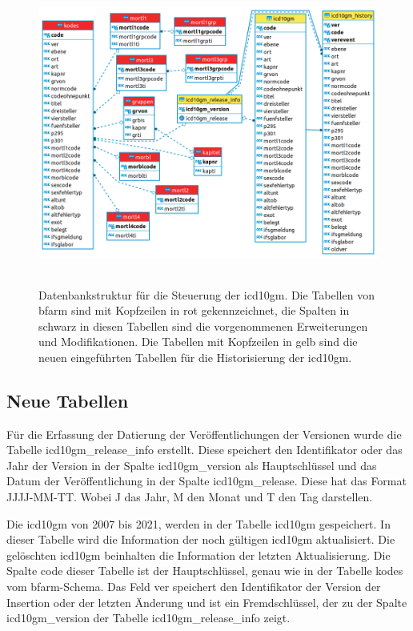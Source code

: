 \clearpage	

\begin{figure}[ht]
	\centering
	\includegraphics[height=10cm]{figures/icdSqlSchema}
	\caption[Datenbankstruktur]{Datenbankstruktur für die Steuerung der \ac{icd10gm}. Die Tabellen von \ac{bfarm} sind mit Kopfzeilen in rot gekennzeichnet, die Spalten in schwarz in diesen Tabellen sind die vorgenommenen Erweiterungen und Modifikationen. Die Tabellen mit Kopfzeilen in gelb sind die neuen eingeführten Tabellen für die Historisierung der \ac{icd10gm}.}
	\label{fig:reldb2}
\end{figure}

\subsection{Neue Tabellen} \label{subsec:newtables}

Für die Erfassung der Datierung der Veröffentlichungen der Versionen wurde die Tabelle \glqq\textsf{icd10gm\_release\_info}\grqq{} erstellt. Diese speichert den Identifikator oder das Jahr der Version in der Spalte \glqq\textsf{icd10gm\_version}\grqq{} als Hauptschlüssel und das Datum der Veröffentlichung in der Spalte \glqq\textsf{icd10gm\_release}\grqq{}. Diese hat das Format \glqq\textsf{JJJJ-MM-TT}\grqq{}. Wobei \glqq J\grqq{} das Jahr, \glqq M\grqq{} den Monat und \glqq T\grqq{} den Tag darstellen.

Die \ac{icd10gm} von 2007 bis 2021, werden in der Tabelle \glqq\textsf{icd10gm}\grqq{} gespeichert. In dieser Tabelle wird die Information der noch gültigen \ac{icd10gm} aktualisiert. Die gelöschten \ac{icd10gm} beinhalten die Information der letzten Aktualisierung. Die Spalte \glqq\textsf{code}\grqq{} dieser Tabelle ist der Hauptschlüssel, genau wie in der Tabelle \glqq\textsf{kodes}\grqq{} vom \ac{bfarm}-Schema. Das Feld \glqq\textsf{ver}\grqq{} speichert den Identifikator der Version der Insertion oder der letzten Änderung und ist ein Fremdschlüssel, der zu der Spalte \glqq\textsf{icd10gm\_version}\grqq{} der Tabelle \glqq\textsf{icd10gm\_release\_info}\grqq{} zeigt.

